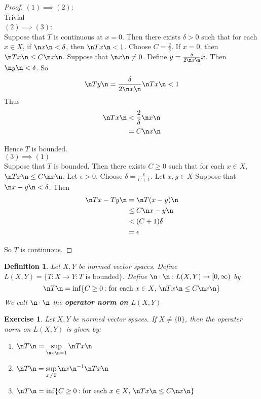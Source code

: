 \documentclass[12pt]{amsart}
\newtheorem{defn}[thm]{Definition}
\newtheorem{ex}[thm]{Exercise}
\newcommand{\del}{\delta}
\newcommand{\ep}{\epsilon}
\newcommand{\Rg}{[0,\infty)}
\begin{document}
\begin{proof}
	$(1) \implies (2)$:\\
	Trivial\vspace{1cm}\\
	$(2) \implies (3)$:\\
	Suppose that $T$ is continuous at $x=0$. Then there exists $\del>0$ such that for each $x \in X$, if $\n x \n < \del$, then $\n Tx \n< 1$. Choose $C = \frac{2}{\del}$. If $x=0$, then $\n Tx \n \leq C \n x \n$. Suppose that $\n x \n \neq 0$. Define $y = \frac{\del}{2 \n x \n}x$. Then $\n y \n < \del$. So $$ \n Ty \n
	= \frac{\del}{2 \n x \n } \n Tx \n < 1$$
	Thus 
	\begin{align*}
		\n Tx \n 
		&< \frac{2}{\del} \n x \n\\
		&=C \n x \n
	\end{align*}
	
	Hence $T$ is bounded.\vspace{1cm}\\
	$(3) \implies (1)$\\
	Suppose that $T$ is bounded. Then there exists $C \geq 0$ such that for each $x \in X$, $\n Tx \n \leq C\n x \n$. Let $\ep >0$. Choose $\del = \frac{\ep}{C+1}$. Let $x,y \in X$ Suppose that $\n x-y \n < \del$. Then 
	\begin{align*}
		\n Tx-Ty \n
		& = \n T(x-y) \n\\
		& \leq C \n x-y \n \\
		&< (C+1) \del\\ 
		&= \ep
	\end{align*}
	
	So $T$ is continuous.
\end{proof}

\begin{defn}
	Let $X,Y$ be normed vector spaces. Define $L(X,Y) = \{T:X \rightarrow Y: T \text{ is bounded}\}$. Define $\n \cdot\n : L(X,Y)\rightarrow \Rg$ by $$\n T\n  = \inf \{C \geq 0: \text{for each }x \in X\text{, } \n Tx \n \leq C\n x\n \}$$ We call $\n \cdot \n $ the \textbf{operator norm on $L(X,Y)$}
\end{defn}

\begin{ex}
	Let $X,Y$ be normed vector spaces. If $X\neq \{0\}$, then the operater norm on $L(X,Y)$ is given by: 
	\begin{enumerate}
		\item $\n T\n  = \sup\limits_{\n x\n =1}\n Tx\n$
		\item $\n T\n  = \sup\limits_{x \neq 0}\n x\n^{-1} \n Tx\n $
		\item $\n T\n  = \inf \{C \geq 0: \text{for each }x \in X\text{, } \n Tx \n \leq C\n x\n \}$
	\end{enumerate}
\end{ex}
\end{document}
